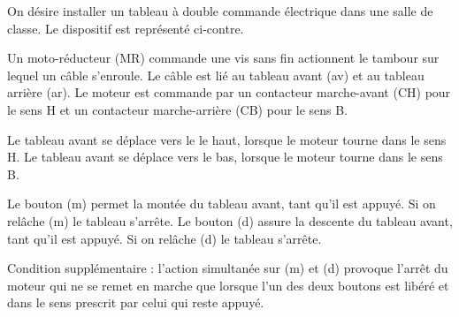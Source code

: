 \documentclass[10pt]{article}
\begin{document}
\begin{minipage}[c]{.7\linewidth}
On désire installer un tableau à double commande électrique dans une salle de classe. Le dispositif est représenté ci-contre.

Un moto-réducteur (MR) commande une vis sans fin actionnent le tambour sur lequel un câble s'enroule. Le câble est lié au tableau avant (av) et au tableau arrière (ar). Le moteur est commande par un contacteur marche-avant (CH) pour le sens H et un contacteur marche-arrière (CB) pour le sens B. 

Le tableau avant se déplace vers le le haut, lorsque le moteur tourne dans le sens H. Le tableau avant se déplace vers le bas, lorsque le moteur tourne dans le sens B. 

Le bouton (m) permet la montée du tableau avant, tant qu'il est appuyé. Si on relâche (m) le tableau s'arrête. 
Le bouton (d) assure la descente du tableau avant, tant qu'il est appuyé. Si on relâche (d) le tableau s'arrête. 

Condition supplémentaire : l'action simultanée sur (m) et (d) provoque l'arrêt du moteur qui ne se remet en marche que lorsque l'un des deux boutons est libéré et dans le sens prescrit par celui qui reste appuyé.
\end{minipage} \hfill
\end{document}
